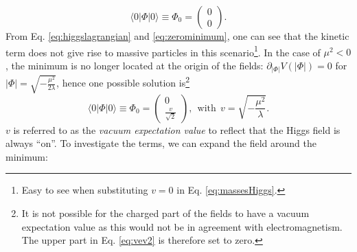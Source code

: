 \begin{equation}
\label{eq:zerominimum}
\langle 0|\Phi|0\rangle \equiv \Phi_0 = \begin{pmatrix} 0 \\ 0 \end{pmatrix}.
\end{equation} 
From Eq. \ref{eq:higgslagrangian} and \ref{eq:zerominimum}, one can see that the kinetic term does not give rise to massive particles in this scenario\footnote{Easy to see when substituting $v=0$ in Eq. \ref{eq:massesHiggs}.}. In the case of $\mu^2 < 0$, the minimum is no longer located at the origin of the fields: $\partial_{|\Phi|} V(|\Phi|) = 0$ for $|\Phi| = \sqrt{-\frac{\mu^2}{2\lambda}}$, hence one possible solution is\footnote{It is not possible for the charged part of the fields to have a vacuum expectation value as this would not be in agreement with electromagnetism. The upper part in Eq. \ref{eq:vev2} is therefore set to zero.}
\begin{equation}
\label{eq:vev2}
\langle 0|\Phi|0\rangle \equiv \Phi_0 = \begin{pmatrix} 0 \\ \frac{v}{\sqrt{2}} \end{pmatrix}, \ \ \textrm{with} \ \ v = \sqrt{-\frac{\mu^2}{\lambda}}.
\end{equation} 
$v$ is referred to as the \textit{vacuum expectation value} to reflect that the Higgs field is always ``on''. To investigate the terms, we can expand the field around the minimum:

